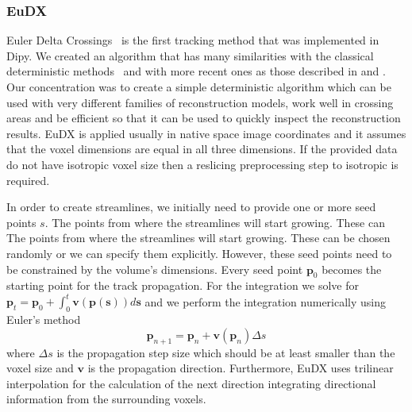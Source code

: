 \documentclass{bioinfo}
\begin{document}
\subsubsection{EuDX}
Euler Delta Crossings~\citep{Garyfallidis_thesis} is the first tracking
method that was implemented in Dipy. We created an algorithm that has many
similarities with the classical deterministic methods~\citep{Mori1999,
  conturo-lori-etal:99, basser-pajevic-etal:00} and with more recent ones as
those described in \citet{descoteaux-deriche-etal:09} and 
\citet{yeh-etal:10}. Our concentration was to create a simple
deterministic algorithm which can be used with very different families of
reconstruction models, work well in crossing areas and be efficient so that it
can be used to quickly inspect the reconstruction results. EuDX is applied
usually in native space image coordinates and it assumes that the voxel
dimensions are equal in all three dimensions. If the provided data do not have
isotropic voxel size then a reslicing preprocessing step to isotropic is
required.

In order to create streamlines, we initially need to provide one or more seed
points $s$. The points from where the streamlines will start growing. These can
The points from where the streamlines will start growing. These can
be chosen randomly or we can specify them explicitly. However, these seed
points need to be constrained by the volume's dimensions. Every seed point
$\mathbf{p}_{0}$ becomes the starting point for the track propagation. For the
integration we solve for
$\mathbf{p}_{t}=\mathbf{p}_{0}+\int_{0}^{t}\mathbf{v}(\mathbf{p}(\mathbf{s}))d\mathbf{s}$
and we perform the integration numerically using Euler's method
\begin{equation}
\mathbf{p}_{n+1}=\mathbf{p}_{n}+\mathbf{v}(\mathbf{p}_{n})\Delta s\label{eq:euler}
\end{equation}
\noindent where $\Delta s$ is the propagation step size which should be at
least smaller than the voxel size and $\mathbf{v}$ is the propagation
direction. Furthermore, EuDX uses trilinear interpolation for the calculation
of the next direction integrating directional information from the surrounding
voxels.
\end{document}
